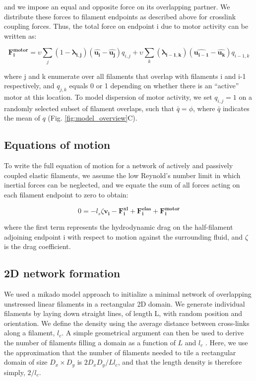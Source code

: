and we impose an equal and opposite force on its overlapping partner.  We distribute these forces to filament endpoints as described above for crosslink coupling forces.  Thus, the total force on endpoint i due to motor activity can be written as:

\begin{equation}
\label{eqn:active}
\mathbf{F^{motor}_{i}} = \upsilon \sum_j (1 - \mathbf{\lambda_{i,j}}) \left (\mathbf{\hat{u_{i}}} - \mathbf{\hat{u_j}} \right ) q_{i,j}
+  \upsilon \sum_k (\mathbf{\lambda_{i-1,k}}) \left (\mathbf{\hat{u_{i-1}}} - \mathbf{\hat{u_k}} \right ) q_{i-1,k} 
\end{equation}


where j and k enumerate over all filaments that overlap with filaments i and i-1 respectively, and $q_{j,k}$ equals 0 or 1 depending on whether there is an ``active'' motor at this location. To model dispersion of motor activity, we set $q_{i,j}=1$  on a randomly selected subset of filament overlaps, such that $\bar{q}=\phi$, where $\bar{q}$ indicates the mean of $q$ (Fig. \ref{fig:model_overview}C).

\subsection{Equations of motion}

To write the full equation of motion for a network of actively and passively coupled elastic filaments, we assume the low Reynold's number limit in which inertial forces can be neglected, and we equate the sum of all forces acting on each filament endpoint to zero to obtain:

\begin{equation}
\label{eqn:syst3}
0=-l_s\zeta\mathbf{ v_i} -\mathbf{F^{xl}_i}+ \mathbf{F^{elas}_i}+\mathbf{F^{motor}_i} 
\end{equation}

where the first term represents the hydrodynamic drag on the half-filament adjoining endpoint i with respect to motion against the surrounding fluid, and $\zeta$ is the drag coefficient.

\subsection{2D network formation}

We used a mikado model approach \cite{Unterberger2014} to initialize a minimal network of overlapping unstressed linear filaments in a rectangular 2D domain. We generate individual filaments by laying down straight lines, of length L, with random position and orientation. We define the density using the average distance between cross-links along a filament, $l_c$. A simple geometrical argument can then be used to derive the number of filaments filling a domain as a function of $L$ and $l_c$ \cite{theo_hlm}.  Here, we use the approximation that the number of filaments needed to tile a rectangular domain of size $D_x \times D_y$  is $2D_xD_y/Ll_c$, and that the length density is therefore simply, $2/l_c$. 

